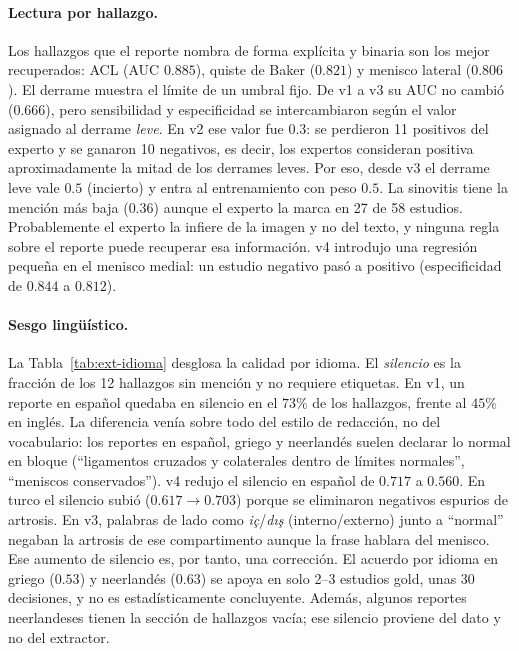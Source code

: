 \paragraph{Lectura por hallazgo.}
Los hallazgos que el reporte nombra de forma explícita y binaria son los mejor recuperados: ACL (AUC $0.885$), quiste de Baker ($0.821$) y menisco lateral ($0.806$).
El derrame muestra el límite de un umbral fijo.
De v1 a v3 su AUC no cambió ($0.666$), pero sensibilidad y especificidad se intercambiaron según el valor asignado al derrame \emph{leve}.
En v2 ese valor fue $0.3$: se perdieron 11 positivos del experto y se ganaron 10 negativos, es decir, los expertos consideran positiva aproximadamente la mitad de los derrames leves.
Por eso, desde v3 el derrame leve vale $0.5$ (incierto) y entra al entrenamiento con peso $0.5$.
La sinovitis tiene la mención más baja ($0.36$) aunque el experto la marca en 27 de 58 estudios.
Probablemente el experto la infiere de la imagen y no del texto, y ninguna regla sobre el reporte puede recuperar esa información.
v4 introdujo una regresión pequeña en el menisco medial: un estudio negativo pasó a positivo (especificidad de $0.844$ a $0.812$).

\paragraph{Sesgo lingüístico.}
La Tabla~\ref{tab:ext-idioma} desglosa la calidad por idioma.
El \emph{silencio} es la fracción de los 12 hallazgos sin mención y no requiere etiquetas.
En v1, un reporte en español quedaba en silencio en el $73\%$ de los hallazgos, frente al $45\%$ en inglés.
La diferencia venía sobre todo del estilo de redacción, no del vocabulario: los reportes en español, griego y neerlandés suelen declarar lo normal en bloque (``ligamentos cruzados y colaterales dentro de límites normales'', ``meniscos conservados'').
v4 redujo el silencio en español de $0.717$ a $0.560$.
En turco el silencio subió ($0.617 \rightarrow 0.703$) porque se eliminaron negativos espurios de artrosis.
En v3, palabras de lado como \emph{iç}/\emph{dış} (interno/externo) junto a ``normal'' negaban la artrosis de ese compartimento aunque la frase hablara del menisco.
Ese aumento de silencio es, por tanto, una corrección.
El acuerdo por idioma en griego ($0.53$) y neerlandés ($0.63$) se apoya en solo 2--3 estudios gold, unas 30 decisiones, y no es estadísticamente concluyente.
Además, algunos reportes neerlandeses tienen la sección de hallazgos vacía; ese silencio proviene del dato y no del extractor.


